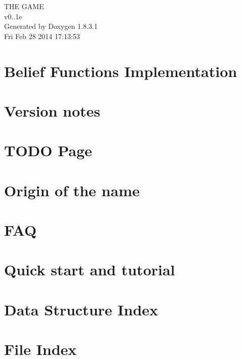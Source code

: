 \documentclass{book}
\begin{document}
\hypersetup{pageanchor=false,citecolor=blue}
\begin{titlepage}
\vspace*{7cm}
\begin{center}
{\Large T\-H\-E G\-A\-M\-E \\[1ex]\large v0..\-1e }\\
\vspace*{1cm}
{\large Generated by Doxygen 1.8.3.1}\\
\vspace*{0.5cm}
{\small Fri Feb 28 2014 17:13:53}\\
\end{center}
\end{titlepage}
\clearemptydoublepage
{}
\tableofcontents
\clearemptydoublepage
{}
\hypersetup{pageanchor=true,citecolor=blue}
\chapter{Belief Functions Implementation}
\label{index}\hypertarget{index}{}
\chapter{Version notes}
\label{version_sec}
\hypertarget{version_sec}{}

\chapter{T\-O\-D\-O Page}
\label{TODO}
\hypertarget{TODO}{}

\chapter{Origin of the name}
\label{origin_page}
\hypertarget{origin_page}{}

\chapter{F\-A\-Q}
\label{FAQ_page}
\hypertarget{FAQ_page}{}

\chapter{Quick start and tutorial}
\label{Tuto_page}
\hypertarget{Tuto_page}{}

\chapter{Data Structure Index}

\chapter{File Index}

\end{document}
